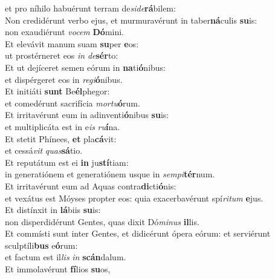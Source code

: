 \evenverse et pro níhilo habuérunt terram de\textit{si}\textit{de}\textbf{rá}bilem:\\
\oddverse Non credidérunt verbo ejus, et murmuravérunt in taber\textbf{ná}culis \textbf{su}is:~\*\\
\oddverse non exaudiérunt \textit{vo}\textit{cem} \textbf{Dó}mini.\\
\evenverse Et elevávit manum suam \textbf{su}per \textbf{e}os:~\*\\
\evenverse ut prostérneret eos \textit{in} \textit{de}\textbf{sér}to:\\
\oddverse Et ut dejíceret semen eórum in \textbf{na}ti\textbf{ó}nibus:~\*\\
\oddverse et dispérgeret eos in \textit{re}\textit{gi}\textbf{ó}nibus.\\
\evenverse Et initiáti \textbf{sunt} Be\textbf{él}phegor:~\*\\
\evenverse et comedérunt sacrifícia \textit{mor}\textit{tu}\textbf{ó}rum.\\
\oddverse Et irritavérunt eum in adinventi\textbf{ó}nibus \textbf{su}is:~\*\\
\oddverse et multiplicáta est in e\textit{is} \textit{ru}\textbf{í}na.\\
\evenverse Et stetit Phínees, \textbf{et} pla\textbf{cá}vit:~\*\\
\evenverse et cessá\textit{vit} \textit{quas}\textbf{sá}tio.\\
\oddverse Et reputátum est ei \textbf{in} ju\textbf{stí}tiam:~\*\\
\oddverse in generatiónem et generatiónem usque in \textit{sem}\textit{pi}\textbf{tér}num.\\
\evenverse Et irritavérunt eum ad Aquas contra\textbf{di}cti\textbf{ó}nis:~\*\\
\evenverse et vexátus est Móyses propter eos: quia exacerbavérunt spí\textit{ri}\textit{tum} \textbf{e}jus.\\
\oddverse Et distínxit in \textbf{lá}biis \textbf{su}is:~\*\\
\oddverse non disperdidérunt Gentes, quas dixit Dó\textit{mi}\textit{nus} \textbf{il}lis.\\
\evenverse Et commísti sunt inter Gentes, et didicérunt ópera eórum: et serviérunt sculptíli\textbf{bus} e\textbf{ó}rum:~\*\\
\evenverse et factum est il\textit{lis} \textit{in} \textbf{scán}dalum.\\
\oddverse Et immolavérunt \textbf{fí}lios \textbf{su}os,~\*\\
